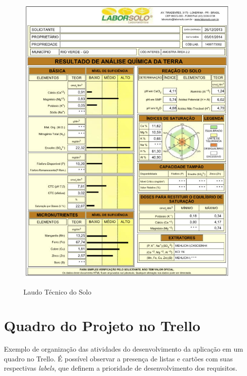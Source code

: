 \begin{anexosenv}
\begin{figure}[H]
    \centering
    \caption{Laudo Técnico do Solo}
    \includegraphics[width=13cm]{./dados/figuras/ex_analise_quimica.jpg}
    \label{fig:laudotecnico}
\end{figure}



\chapter{Quadro do Projeto no Trello}
\label{chap:exemploQuadroTrello}

Exemplo de organização das atividades do desenvolvimento da aplicação em um quadro no Trello. É possível observar a presença de listas e cartões com suas respectivas \textit{labels}, que definem a prioridade de desenvolvimento dos requisitos.


\end{anexosenv}
